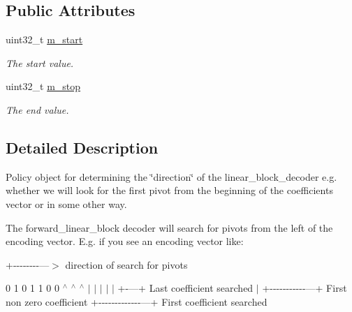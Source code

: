 \subsection*{Public Attributes}
\begin{DoxyCompactItemize}
\item 
\hypertarget{structkodo_1_1forward__linear__block__decoder__policy_a143c7806c3b8f444a6bd15f523990835}{uint32\-\_\-t \hyperlink{structkodo_1_1forward__linear__block__decoder__policy_a143c7806c3b8f444a6bd15f523990835}{m\-\_\-start}}\label{structkodo_1_1forward__linear__block__decoder__policy_a143c7806c3b8f444a6bd15f523990835}

\begin{DoxyCompactList}\small\item\em The start value. \end{DoxyCompactList}\item 
\hypertarget{structkodo_1_1forward__linear__block__decoder__policy_aca8d420bb3ccd6b52855d75c2260b9f6}{uint32\-\_\-t \hyperlink{structkodo_1_1forward__linear__block__decoder__policy_aca8d420bb3ccd6b52855d75c2260b9f6}{m\-\_\-stop}}\label{structkodo_1_1forward__linear__block__decoder__policy_aca8d420bb3ccd6b52855d75c2260b9f6}

\begin{DoxyCompactList}\small\item\em The end value. \end{DoxyCompactList}\end{DoxyCompactItemize}


\subsection{Detailed Description}
Policy object for determining the \char`\"{}direction\char`\"{} of the linear\-\_\-block\-\_\-decoder e.\-g. whether we will look for the first pivot from the beginning of the coefficients vector or in some other way.

The forward\-\_\-linear\-\_\-block decoder will search for pivots from the left of the encoding vector. E.\-g. if you see an encoding vector like\-:

+-\/-\/-\/-\/-\/-\/-\/-\/---$>$ direction of search for pivots

0 1 0 1 1 0 0 $^\wedge$ $^\wedge$ $^\wedge$ $|$ $|$ $|$ $|$ $|$ +-\/---+ Last coefficient searched $|$ +-\/-\/-\/-\/-\/-\/-\/-\/-\/-\/-\/---+ First non zero coefficient +-\/-\/-\/-\/-\/-\/-\/-\/-\/-\/-\/-\/-\/---+ First coefficient searched 


